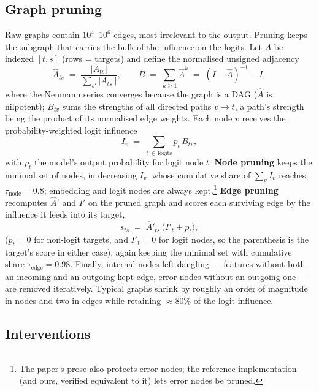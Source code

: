 \documentclass[11pt,a4paper]{article}
\begin{document}
\subsection{Graph pruning}\label{sec:method:prune}

Raw graphs contain $10^4$--$10^6$ edges, most irrelevant to the output. Pruning keeps
the subgraph that carries the bulk of the influence on the logits. Let $A$ be indexed
$[t,s]$ (rows = targets) and define the normalised unsigned adjacency
\begin{equation}
\hat{A}_{ts} \;=\; \frac{\lvert A_{ts}\rvert}{\sum_{s'} \lvert A_{ts'}\rvert},
\qquad
B \;=\; \sum_{k\ge1} \hat{A}^{k} \;=\; (I-\hat{A})^{-1} - I,
\end{equation}
where the Neumann series converges because the graph is a DAG ($\hat A$ is nilpotent);
$B_{tv}$ sums the strengths of all directed paths $v\!\to\!t$, a path's strength being
the product of its normalised edge weights. Each node $v$ receives the
probability-weighted logit influence
\begin{equation}
I_v \;=\; \sum_{t\,\in\,\mathrm{logits}} p_t\, B_{tv},
\label{eq:influence}
\end{equation}
with $p_t$ the model's output probability for logit node $t$. \textbf{Node pruning}
keeps the minimal set of nodes, in decreasing $I_v$, whose cumulative share of
$\sum_v I_v$ reaches $\tau_{\mathrm{node}}=0.8$; embedding and logit nodes are always
kept.\footnote{The paper's prose also protects error nodes; the reference
implementation (and ours, verified equivalent to it) lets error nodes be pruned.}
\textbf{Edge pruning} recomputes $\hat{A}'$ and $I'$ on the pruned graph and scores
each surviving edge by the influence it feeds into its target,
\begin{equation}
s_{ts} \;=\; \hat{A}'_{ts}\,\big(I'_t + p_t\big),
\end{equation}
($p_t=0$ for non-logit targets, and $I'_t=0$ for logit nodes, so the parenthesis is
the target's score in either case), again keeping the minimal set with cumulative
share $\tau_{\mathrm{edge}}=0.98$. Finally, internal nodes left dangling --- features
without both an incoming and an outgoing kept edge, error nodes without an outgoing
one --- are removed iteratively. Typical graphs shrink by roughly an order of
magnitude in nodes and two in edges while retaining $\approx\!80\%$ of the logit
influence.

\subsection{Interventions}\label{sec:method:interv}
\end{document}
